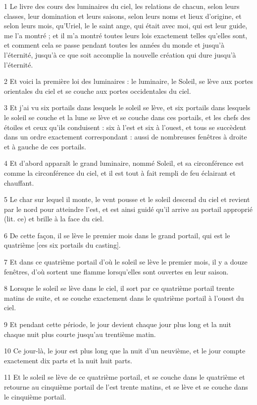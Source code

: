 \par 1 Le livre des cours des luminaires du ciel, les relations de chacun, selon leurs classes, leur domination et leurs saisons, selon leurs noms et lieux d'origine, et selon leurs mois, qu'Uriel, le le saint ange, qui était avec moi, qui est leur guide, me l'a montré ; et il m'a montré toutes leurs lois exactement telles qu'elles sont, et comment cela se passe pendant toutes les années du monde et jusqu'à l'éternité, jusqu'à ce que soit accomplie la nouvelle création qui dure jusqu'à l'éternité.
\par 2 Et voici la première loi des luminaires : le luminaire, le Soleil, se lève aux portes orientales du ciel et se couche aux portes occidentales du ciel.
\par 3 Et j'ai vu six portails dans lesquels le soleil se lève, et six portails dans lesquels le soleil se couche et la lune se lève et se couche dans ces portails, et les chefs des étoiles et ceux qu'ils conduisent : six à l'est et six à l'ouest, et tous se succèdent dans un ordre exactement correspondant : aussi de nombreuses fenêtres à droite et à gauche de ces portails.
\par 4 Et d'abord apparaît le grand luminaire, nommé Soleil, et sa circonférence est comme la circonférence du ciel, et il est tout à fait rempli de feu éclairant et chauffant.
\par 5 Le char sur lequel il monte, le vent pousse et le soleil descend du ciel et revient par le nord pour atteindre l'est, et est ainsi guidé qu'il arrive au portail approprié (lit. ce) et brille à la face du ciel.
\par 6 De cette façon, il se lève le premier mois dans le grand portail, qui est le quatrième [ces six portails du casting].
\par 7 Et dans ce quatrième portail d'où le soleil se lève le premier mois, il y a douze fenêtres, d'où sortent une flamme lorsqu'elles sont ouvertes en leur saison.
\par 8 Lorsque le soleil se lève dans le ciel, il sort par ce quatrième portail trente matins de suite, et se couche exactement dans le quatrième portail à l'ouest du ciel.
\par 9 Et pendant cette période, le jour devient chaque jour plus long et la nuit chaque nuit plus courte jusqu'au trentième matin.
\par 10 Ce jour-là, le jour est plus long que la nuit d'un neuvième, et le jour compte exactement dix parts et la nuit huit parts.
\par 11 Et le soleil se lève de ce quatrième portail, et se couche dans le quatrième et retourne au cinquième portail de l'est trente matins, et se lève et se couche dans le cinquième portail.
